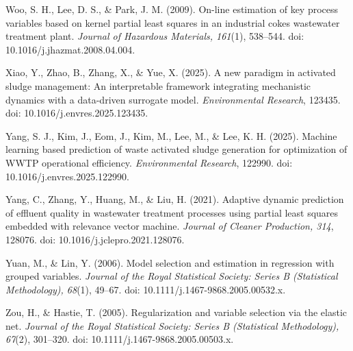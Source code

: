 \documentclass[a4paper,fleqn]{cas-sc}
\begin{document}
\noindent Woo, S. H., Lee, D. S., \& Park, J. M. (2009). On-line estimation of key process variables based on kernel partial least squares in an industrial cokes wastewater treatment plant. \textit{Journal of Hazardous Materials, 161}(1), 538--544. doi: 10.1016/j.jhazmat.2008.04.004.

\noindent Xiao, Y., Zhao, B., Zhang, X., \& Yue, X. (2025). A new paradigm in activated sludge management: An interpretable framework integrating mechanistic dynamics with a data-driven surrogate model. \textit{Environmental Research}, 123435. doi: 10.1016/j.envres.2025.123435.

\noindent Yang, S. J., Kim, J., Eom, J., Kim, M., Lee, M., \& Lee, K. H. (2025). Machine learning based prediction of waste activated sludge generation for optimization of WWTP operational efficiency. \textit{Environmental Research}, 122990. doi: 10.1016/j.envres.2025.122990.

\noindent Yang, C., Zhang, Y., Huang, M., \& Liu, H. (2021). Adaptive dynamic prediction of effluent quality in wastewater treatment processes using partial least squares embedded with relevance vector machine. \textit{Journal of Cleaner Production, 314}, 128076. doi: 10.1016/j.jclepro.2021.128076.

\noindent Yuan, M., \& Lin, Y. (2006). Model selection and estimation in regression with grouped variables. \textit{Journal of the Royal Statistical Society: Series B (Statistical Methodology), 68}(1), 49--67. doi: 10.1111/j.1467-9868.2005.00532.x.

\noindent Zou, H., \& Hastie, T. (2005). Regularization and variable selection via the elastic net. \textit{Journal of the Royal Statistical Society: Series B (Statistical Methodology), 67}(2), 301--320. doi: 10.1111/j.1467-9868.2005.00503.x.
\end{document}

